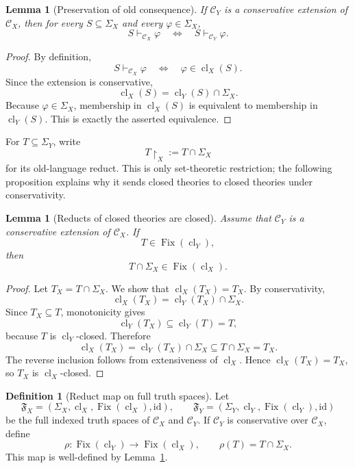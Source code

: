 \documentclass[11pt]{amsart}
\numberwithin{equation}{section}
\theoremstyle{plain}
\newtheorem{lemma}[theorem]{Lemma}
\theoremstyle{definition}
\newtheorem{definition}[theorem]{Definition}
\theoremstyle{remark}
\newcommand{\Cl}{\operatorname{cl}}
\newcommand{\Fix}{\operatorname{Fix}}
\newcommand{\C}{\mathcal C}
\newcommand{\F}{\mathfrak F}
\newcommand{\Sig}{\Sigma}
\newcommand{\restr}[1]{\upharpoonright_{#1}}
\begin{document}
\begin{lemma}[Preservation of old consequence]
\label{lem:conservative-extension-preserves-old-consequence}
If \(\C_Y\) is a conservative extension of \(\C_X\), then for every \(S\subseteq\Sig_X\) and every \(\varphi\in\Sig_X\),
\[
  S\vdash_{\C_X}\varphi
  \quad\Longleftrightarrow\quad
  S\vdash_{\C_Y}\varphi.
\]
\end{lemma}

\begin{proof}
By definition,
\[
  S\vdash_{\C_X}\varphi
  \quad\Longleftrightarrow\quad
  \varphi\in\Cl_X(S).
\]
Since the extension is conservative,
\[
  \Cl_X(S)=\Cl_Y(S)\cap\Sig_X.
\]
Because \(\varphi\in\Sig_X\), membership in \(\Cl_X(S)\) is equivalent to membership in \(\Cl_Y(S)\). This is exactly the asserted equivalence.
\end{proof}

For \(T\subseteq\Sig_Y\), write
\[
  T\restr{X}:=T\cap\Sig_X
\]
for its old-language reduct.  This is only set-theoretic restriction; the following proposition explains why it sends closed theories to closed theories under conservativity.

\begin{lemma}[Reducts of closed theories are closed]
\label{lem:reducts-of-closed-theories-are-closed}
Assume that \(\C_Y\) is a conservative extension of \(\C_X\). If
\[
  T\in\Fix(\Cl_Y),
\]
then
\[
  T\cap\Sig_X\in\Fix(\Cl_X).
\]
\end{lemma}

\begin{proof}
Let \(T_X=T\cap\Sig_X\). We show that \(\Cl_X(T_X)=T_X\). By conservativity,
\[
  \Cl_X(T_X)=\Cl_Y(T_X)\cap\Sig_X.
\]
Since \(T_X\subseteq T\), monotonicity gives
\[
  \Cl_Y(T_X)\subseteq\Cl_Y(T)=T,
\]
because \(T\) is \(\Cl_Y\)-closed. Therefore
\[
  \Cl_X(T_X)=\Cl_Y(T_X)\cap\Sig_X\subseteq T\cap\Sig_X=T_X.
\]
The reverse inclusion follows from extensiveness of \(\Cl_X\). Hence \(\Cl_X(T_X)=T_X\), so \(T_X\) is \(\Cl_X\)-closed.
\end{proof}

\begin{definition}[Reduct map on full truth spaces]
\label{def:reduct-map-full-truth-spaces}
Let
\[
  \F_X=(\Sig_X,\Cl_X,\Fix(\Cl_X),\mathrm{id}),
  \qquad
  \F_Y=(\Sig_Y,\Cl_Y,\Fix(\Cl_Y),\mathrm{id})
\]
be the full indexed truth spaces of \(\C_X\) and \(\C_Y\). If \(\C_Y\) is conservative over \(\C_X\), define
\[
  \rho:\Fix(\Cl_Y)\to\Fix(\Cl_X),
  \qquad
  \rho(T)=T\cap\Sig_X.
\]
This map is well-defined by Lemma~\ref{lem:reducts-of-closed-theories-are-closed}.
\end{definition}
\end{document}
